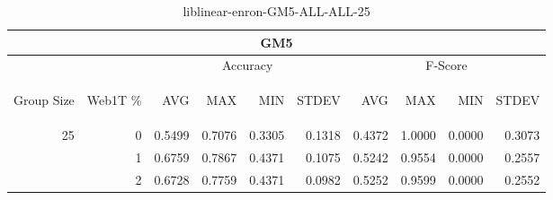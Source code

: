 \begin{center}
\begin{table}[htbp] 
 \begin{center}
\begin{tabular}{ | r | r | r | r | r | r | r | r | r | r |}
\hline
\multicolumn{10}{|c|}{GM5}\\
\hline
 & & \multicolumn{4}{|c|}{Accuracy} & \multicolumn{4}{|c|}{F-Score}\\ \cline{3-10}
\begin{sideways}Group Size\end{sideways} & \begin{sideways}Web1T \%\end{sideways} & \begin{sideways}AVG\end{sideways} & \begin{sideways}MAX\end{sideways} & \begin{sideways}MIN\end{sideways} & \begin{sideways}STDEV\end{sideways} & \begin{sideways}AVG\end{sideways} & \begin{sideways}MAX\end{sideways} & \begin{sideways}MIN\end{sideways} & \begin{sideways}STDEV\end{sideways}\\
\hline
\multirow{2}{*}{25}
 & 0 & 0.5499 & 0.7076 & 0.3305 & 0.1318 & 0.4372 & 1.0000 & 0.0000 & 0.3073\\ \cline{2-10}
 & 1 & 0.6759 & 0.7867 & 0.4371 & 0.1075 & 0.5242 & 0.9554 & 0.0000 & 0.2557\\ \cline{2-10}
 & 2 & 0.6728 & 0.7759 & 0.4371 & 0.0982 & 0.5252 & 0.9599 & 0.0000 & 0.2552\\ \cline{2-10}
\hline
\end{tabular}
\caption{liblinear-enron-GM5-ALL-ALL-25}
\label{table:liblinear-enron-GM5-ALL-ALL-25}
\end{center}
 \end{table}
\end{center}

